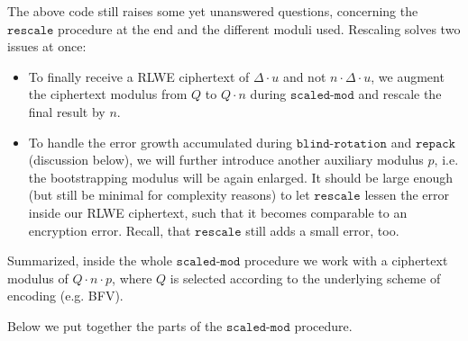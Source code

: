 \documentclass[letterpaper,10pt,english]{jupyterBook}
\begin{document}
\begin{DUlineblock}{0em}
\item[] 
\end{DUlineblock}

\sphinxAtStartPar
The above code still raises some yet unanswered questions, concerning the \(\texttt{rescale}\) procedure at the end and the different moduli used.
Rescaling solves two issues at once:
\begin{itemize}
\item {} 
\sphinxAtStartPar
To finally receive a RLWE ciphertext of \(\Delta \cdot u\) and not \(n\cdot\Delta\cdot u\), we augment the ciphertext modulus from \(Q\) to \(Q\cdot n\) during \(\texttt{scaled-mod}\) and rescale the final result by \(n\).

\item {} 
\sphinxAtStartPar
To handle the error growth accumulated during \(\texttt{blind-rotation}\) and \(\texttt{repack}\) (discussion below), we will further introduce another auxiliary modulus \(p\), i.e. the bootstrapping modulus will be again enlarged.
It should be large enough (but still be minimal for complexity reasons) to let \(\texttt{rescale}\) lessen the error inside our RLWE ciphertext, such that it becomes comparable to an encryption error.
Recall, that \(\texttt{rescale}\) still adds a small error, too.

\end{itemize}

\sphinxAtStartPar
Summarized, inside the whole \(\texttt{scaled-mod}\) procedure we work with a ciphertext modulus of \(Q \cdot n \cdot p\), where \(Q\) is selected according to the underlying scheme of encoding (e.g. BFV).

\sphinxAtStartPar
Below we put together the parts of the \(\texttt{scaled-mod}\) procedure.
\end{document}
